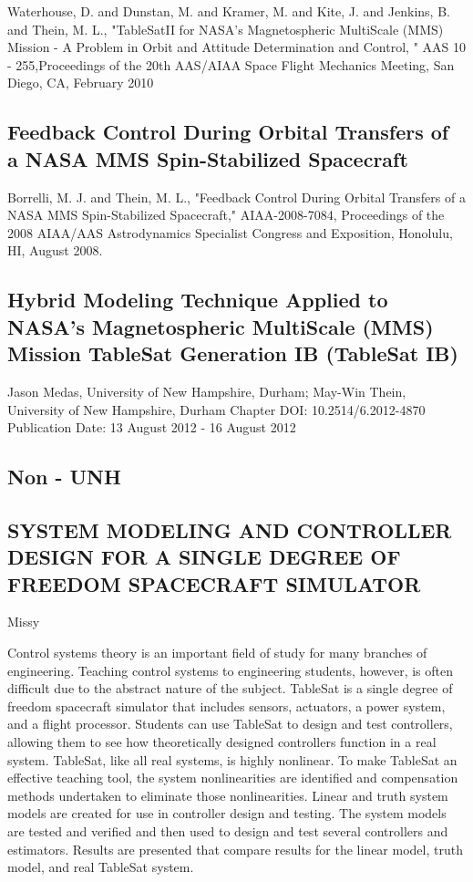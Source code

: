 Waterhouse, D. and Dunstan, M. and Kramer, M. and Kite, J. and Jenkins, B. and Thein, M. L., "TableSatII for NASA's Magnetospheric MultiScale (MMS) Mission - A Problem in Orbit and Attitude Determination and Control, " AAS 10 - 255,Proceedings of the 20th AAS/AIAA Space Flight Mechanics Meeting, San Diego, CA, February 2010

\subsection{Feedback Control During Orbital Transfers of a NASA MMS Spin-Stabilized Spacecraft}

Borrelli, M. J. and Thein, M. L., "Feedback Control During Orbital Transfers of a NASA MMS Spin-Stabilized Spacecraft," AIAA-2008-7084, Proceedings of the 2008 AIAA/AAS Astrodynamics Specialist Congress and Exposition, Honolulu, HI, August 2008.

\subsection{Hybrid Modeling Technique Applied to NASA's Magnetospheric MultiScale (MMS) Mission TableSat Generation IB (TableSat IB)}

Jason Medas, University of New Hampshire, Durham; May-Win Thein, University of New Hampshire, Durham
Chapter DOI: 10.2514/6.2012-4870
Publication Date: 13 August 2012 - 16 August 2012

\subsection{Non - UNH}

\subsection{SYSTEM MODELING AND CONTROLLER
DESIGN FOR A SINGLE DEGREE
OF FREEDOM SPACECRAFT SIMULATOR}

Missy

Control systems theory is an important field of study for many branches of
engineering. Teaching control systems to engineering students, however, is often
difficult due to the abstract nature of the subject. TableSat is a single degree of
freedom spacecraft simulator that includes sensors, actuators, a power system,
and a flight processor. Students can use TableSat to design and test controllers,
allowing them to see how theoretically designed controllers function in a real
system. TableSat, like all real systems, is highly nonlinear. To make TableSat an
effective teaching tool, the system nonlinearities are identified and compensation
methods undertaken to eliminate those nonlinearities. Linear and truth system
models are created for use in controller design and testing. The system models
are tested and verified and then used to design and test several controllers and estimators. Results are presented that compare results for the linear model, truth
model, and real TableSat system.


